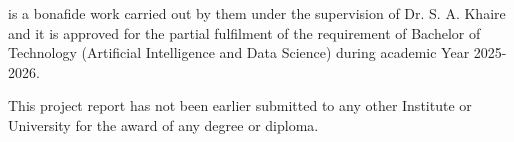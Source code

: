 \vspace*{1.5\baselineskip} %
\noindent is a bonafide work carried out by them under the supervision of Dr. S. A. Khaire and it is approved for the partial fulfilment of the requirement of Bachelor of Technology (Artificial Intelligence and Data Science) during academic Year 2025-2026.

\vspace*{0.8\baselineskip} %
\noindent This project report has not been earlier submitted to any other Institute or University for the award of any degree or diploma.

\vspace*{3.5\baselineskip} %

\bgroup
\def\arraystretch{0.7}
\noindent
{}
\egroup

        
        
